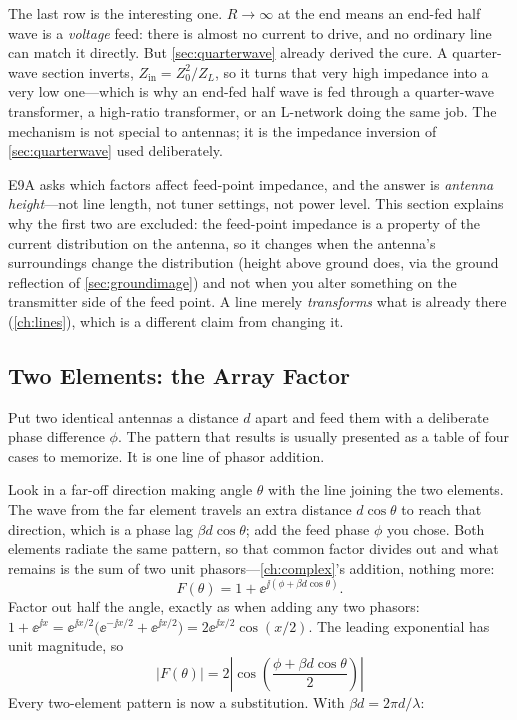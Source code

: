 The last row is the interesting one. \(R\to\infty\) at the end means an end-fed half
wave is a \emph{voltage} feed: there is almost no current to drive, and no ordinary
line can match it directly. But \cref{sec:quarterwave} already derived the cure. A
quarter-wave section inverts, \(Z_{\mathrm{in}}=Z_0^2/Z_L\), so it turns that very
high impedance into a very low one---which is why an end-fed half wave is fed through
a quarter-wave transformer, a high-ratio transformer, or an L-network doing the same
job. The mechanism is not special to antennas; it is the impedance inversion of
\cref{sec:quarterwave} used deliberately.

\begin{exambox}
E9A asks which factors affect feed-point impedance, and the answer is \emph{antenna
height}---not line length, not tuner settings, not power level. This section explains
why the first two are excluded: the feed-point impedance is a property of the current
distribution on the antenna, so it changes when the antenna's surroundings change the
distribution (height above ground does, via the ground reflection of
\cref{sec:groundimage}) and not when you
alter something on the transmitter side of the feed point. A line merely
\emph{transforms} what is already there (\cref{ch:lines}), which is a different claim
from changing it.
\end{exambox}

\subsection{Two Elements: the Array Factor}
\label{sec:arrayfactor}
Put two identical antennas a distance \(d\) apart and feed them with a deliberate
phase difference \(\phi\). The pattern that results is usually presented as a table of
four cases to memorize. It is one line of phasor addition.

Look in a far-off direction making angle \(\theta\) with the line joining the two
elements. The wave from the far element travels an extra distance \(d\cos\theta\) to
reach that direction, which is a phase lag \(\beta d\cos\theta\); add the feed phase
\(\phi\) you chose. Both elements radiate the same pattern, so that common factor
divides out and what remains is the sum of two unit phasors---\cref{ch:complex}'s
addition, nothing more:
\[
F(\theta)=1+\ee^{\jj\left(\phi+\beta d\cos\theta\right)} .
\]
Factor out half the angle, exactly as when adding any two phasors:
\(1+\ee^{\jj x}=\ee^{\jj x/2}\bigl(\ee^{-\jj x/2}+\ee^{\jj x/2}\bigr)=2\ee^{\jj x/2}\cos(x/2)\).
The leading exponential has unit magnitude, so
\[
\boxed{\;|F(\theta)|=2\left|\cos\!\left(\frac{\phi+\beta d\cos\theta}{2}\right)\right|\;}
\]
Every two-element pattern is now a substitution. With \(\beta d=2\pi d/\lambda\):

